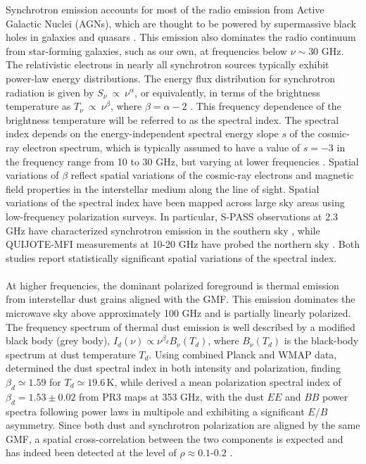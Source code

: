 Synchrotron emission accounts for most of the radio emission from Active Galactic Nuclei (AGNs), which are thought to be powered by supermassive black holes in galaxies and quasars \citep{black_holes_synch, synch_radio_agn}. This emission also dominates the radio continuum from star-forming galaxies, such as our own, at frequencies below $\nu \sim 30$ GHz. The relativistic electrons in nearly all synchrotron sources typically exhibit power-law energy distributions. The energy flux distribution for synchrotron radiation is given by $S_{\nu} \ \propto \ \nu^{\alpha}$, or equivalently, in terms of the brightness temperature as $T_{\nu} \ \propto \ \nu^{\beta}$, where $\beta = \alpha - 2$ \citep{Rybicki_1979}. This frequency dependence of the brightness temperature will be referred to as the spectral index. The spectral index depends on the energy-independent spectral energy slope $s$ of the cosmic-ray electron spectrum, which is typically assumed to have a value of $s=-3$ in the frequency range from 10 to 30 GHz, but varying at lower frequencies \citep{Padovani_2021}. Spatial variations of $\beta$ reflect spatial variations of the cosmic-ray electrons and magnetic field properties in the interstellar medium along the line of sight. Spatial variations of the spectral index have been mapped across large sky areas using low-frequency polarization surveys. In particular, S-PASS observations at 2.3 GHz have characterized synchrotron emission in the southern sky \citep{Krachmalnicoff_2018}, while QUIJOTE-MFI measurements at 10-20 GHz have probed the northern sky \citep{QUIJOTE_IV}. Both studies report statistically significant spatial variations of the spectral index.
\paragraph{}

At higher frequencies, the dominant polarized foreground is thermal emission from interstellar dust grains aligned with the GMF. This emission dominates the microwave sky above approximately 100 GHz and is partially linearly polarized. The frequency spectrum of thermal dust emission is well described by a modified black body (grey body), $I_d(\nu) \propto \nu^{\beta_d} B_\nu(T_d)$, where $B_\nu(T_d)$ is the black-body spectrum at dust temperature $T_d$. Using combined Planck and WMAP data, \citet{Planck_XXII} determined the dust spectral index in both intensity and polarization, finding $\beta_d \simeq 1.59$ for $T_d \simeq 19.6\,\mathrm{K}$, while \citet{Planck_2018XI} derived a mean polarization spectral index of $\beta_d = 1.53 \pm 0.02$ from PR3 maps at 353 GHz, with the dust $EE$ and $BB$ power spectra following power laws in multipole and exhibiting a significant $E/B$ asymmetry. Since both dust and synchrotron polarization are aligned by the same GMF, a spatial cross-correlation between the two components is expected and has indeed been detected at the level of $\rho \approx 0.1$-$0.2$ \citep{Choi_2015, Planck_2018XI}.

